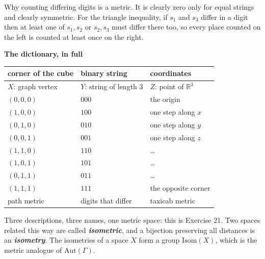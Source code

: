 \documentclass[10pt]{article}
\newcommand{\defterm}[1]{\textbf{\itshape #1}}
\newcommand{\R}{\mathbb{R}}
\begin{document}
{\begin{minipage}[t]{744pt}
\begin{minipage}[t]{368pt}
{
}\par\vspace{2pt}
\begin{why}
Why counting differing digits is a metric. It is clearly zero only for equal strings and clearly symmetric. For the triangle inequality, if $s_1$ and $s_3$ differ in a digit then at least one of $s_1,s_2$ or $s_2,s_3$ must differ there too, so every place counted on the left is counted at least once on the right.
\end{why}
\end{minipage}\hfill
\begin{minipage}[t]{358pt}\vspace{0pt}
{\sffamily\bfseries\color{big} The dictionary, in full}\par\vspace{2pt}
\centering
\begin{tabular}{@{}lll@{}}
\toprule
corner of the cube & binary string & coordinates\\
\midrule
$X$: graph vertex & $Y$: string of length $3$ & $Z$: point of $\R^3$\\
\midrule
$(0,0,0)$ & $000$ & the origin\\
$(1,0,0)$ & $100$ & one step along $x$\\
$(0,1,0)$ & $010$ & one step along $y$\\
$(0,0,1)$ & $001$ & one step along $z$\\
$(1,1,0)$ & $110$ & \dots\\
$(1,0,1)$ & $101$ & \dots\\
$(0,1,1)$ & $011$ & \dots\\
$(1,1,1)$ & $111$ & the opposite corner\\
\midrule
path metric & digits that differ & taxicab metric\\
\bottomrule
\end{tabular}\par\vspace{3pt}
\raggedright
Three descriptions, three names, one metric space: this is Exercise 21. Two spaces related this way are called \defterm{isometric}, and a bijection preserving all distances is an \defterm{isometry}. The isometries of a space $X$ form a group $\mathrm{Isom}(X)$, which is the metric analogue of $\mathrm{Aut}(\Gamma)$.

\end{minipage}
\end{minipage}}
\end{document}
